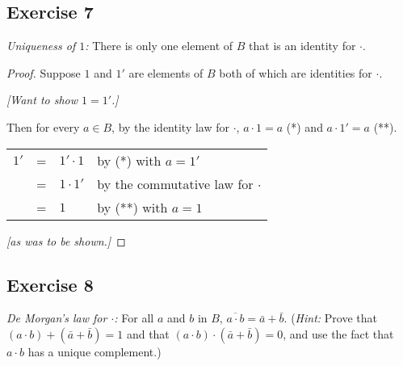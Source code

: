 \documentclass[14pt]{extarticle}
\newcommand{\cy}{\color{cyan}}
\begin{document}
\subsection{Exercise 7}
{\it Uniqueness of $1$:} There is only one element of $B$ that is an identity for $\cdot$.

\begin{proof}
  Suppose $1$ and $1'$ are elements of $B$ both of which are identities for $\cdot$.

    {\it [Want to show $1 = 1'$.]}

  Then for every \(a \in B\), by the identity law for $\cdot$, \(a \cdot 1 = a\) (*) and \(a \cdot 1' = a\) (**).

  \begin{center}
    \begin{tabular}{rcll}
      \(1'\) & = & \(1' \cdot 1\) & {\cy by (*) with \(a=1'\)}               \\
             & = & \(1 \cdot 1'\) & {\cy by the commutative law for $\cdot$} \\
             & = & \(1\)          & {\cy by (**) with \(a = 1\)}
    \end{tabular}
  \end{center}

  {\it [as was to be shown.]}
\end{proof}

\subsection{Exercise 8}
{\it De Morgan’s law for $\cdot$:} For all $a$ and $b$ in $B$, \(\overline{a \cdot b} = \bar{a} + \bar{b}\).
({\it Hint:} Prove that \((a \cdot b) + (\bar{a} + \bar{b})
= 1\) and that \((a \cdot b) \cdot (\bar{a} + \bar{b}) = 0\), and use the fact that \(a \cdot b\) has a unique complement.)
\end{document}

